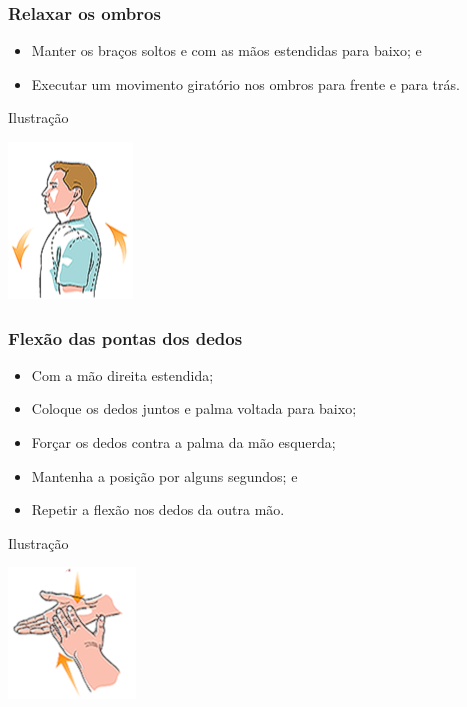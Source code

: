 \documentclass[aspectratio=169]{beamer} %
\begin{document}
\begin{frame}
	\frametitle{Relaxar os ombros}
	
	\begin{itemize}
		\item Manter os bra\c cos soltos e com as mãos estendidas para baixo; e
		\item Executar um movimento giratório nos ombros para frente e para trás.
	\end{itemize}
	\vfill
	
	\begin{exampleblock}{Ilustra\c cão}
		\begin{center}
			\includegraphics[scale=0.5]{img/alongamento5}
		\end{center}			
	\end{exampleblock}
\end{frame}

\begin{frame}
	\frametitle{Flexão das pontas dos dedos}
	
	\begin{itemize}
		\item Com a mão direita estendida;
		\item Coloque os dedos juntos e palma voltada para baixo;
		\item For\c car os dedos contra a palma da mão esquerda;
		\item Mantenha a posi\c cão por alguns segundos; e
		\item Repetir a flexão nos dedos da outra mão.
	\end{itemize}
	\vfill
	
	\begin{exampleblock}{Ilustra\c cão}
		\begin{center}
			\includegraphics[scale=0.5]{img/alongamento6}
		\end{center}			
	\end{exampleblock}
\end{frame}
\end{document}
